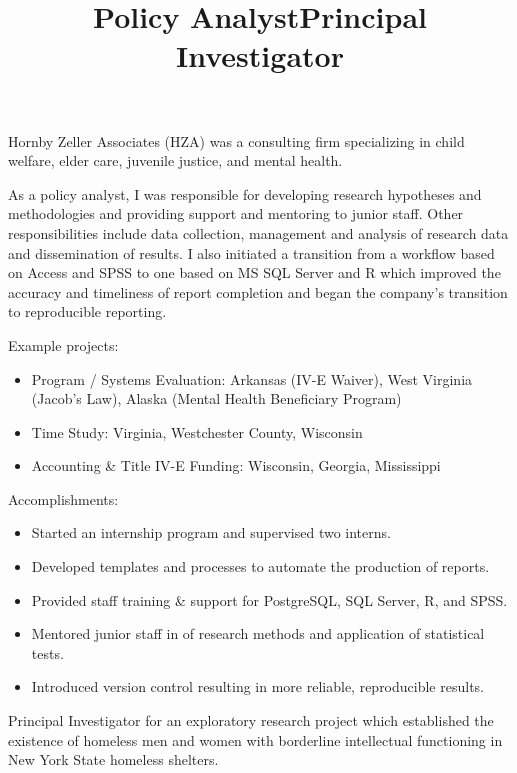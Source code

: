 \documentclass[line, mm, 10pt]{res}
\begin{document}
\begin{resume}
  \title{Policy Analyst}
  \begin{position}
    Hornby Zeller Associates (HZA) was a consulting firm specializing in child
    welfare, elder care, juvenile justice, and mental health. 
    
    As a policy analyst, I was responsible for developing research hypotheses
    and methodologies and providing support and mentoring to junior staff. Other
    responsibilities include data collection, management and analysis of
    research data and dissemination of results. I also initiated a transition
    from a workflow based on Access and SPSS to one based on MS SQL Server and R
    which improved the accuracy and timeliness of report completion and began
    the company's transition to reproducible reporting.

    Example projects:
    \begin{itemize}
    \item Program / Systems Evaluation: Arkansas (IV-E Waiver), West
      Virginia (Jacob's Law), Alaska (Mental Health Beneficiary Program)
    \item Time Study: Virginia, Westchester County, Wisconsin
    \item Accounting \& Title IV-E Funding: Wisconsin, Georgia, Mississippi
    \end{itemize}

    Accomplishments:
    \begin{itemize}
    \item Started an internship program and supervised two interns.
    \item Developed templates and processes to automate the production
      of reports.
    \item Provided staff training \& support for PostgreSQL, SQL
      Server, R, and SPSS.
    \item Mentored junior staff in of research methods and application
      of statistical tests.
    \item Introduced version control resulting in more reliable, reproducible results.
    \end{itemize}
  \end{position}

  \title{Principal Investigator}
  \begin{position}
    Principal Investigator for an exploratory research project which
    established the existence of homeless men and women with
    borderline intellectual functioning in New York State homeless
    shelters.


\end{position}
\end{resume}
\end{document}
